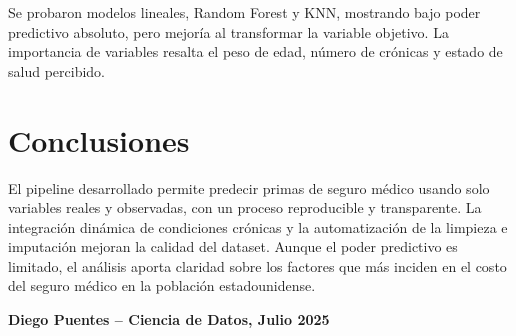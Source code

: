 \documentclass[12pt,a4paper]{article}
\begin{document}
Se probaron modelos lineales, Random Forest y KNN, mostrando bajo poder predictivo absoluto, pero mejoría al transformar la variable objetivo. La importancia de variables resalta el peso de edad, número de crónicas y estado de salud percibido.

\section{Conclusiones}

El pipeline desarrollado permite predecir primas de seguro médico usando solo variables reales y observadas, con un proceso reproducible y transparente. La integración dinámica de condiciones crónicas y la automatización de la limpieza e imputación mejoran la calidad del dataset. Aunque el poder predictivo es limitado, el análisis aporta claridad sobre los factores que más inciden en el costo del seguro médico en la población estadounidense.

\vspace{1em}
\textbf{Diego Puentes -- Ciencia de Datos, Julio 2025}
\end{document}
